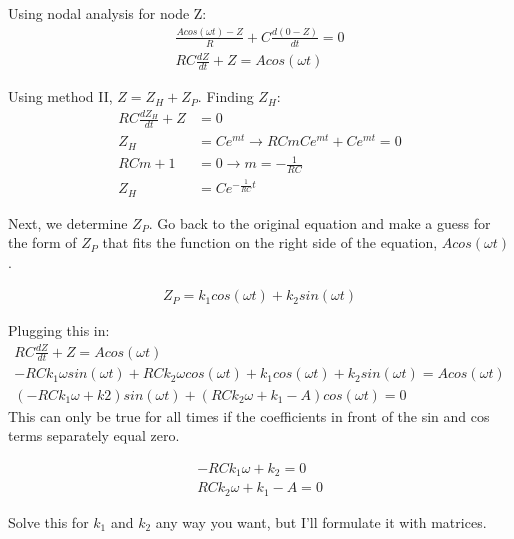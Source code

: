 \documentclass{book}
\numberwithin{equation}{section}
\theoremstyle{definition}
\begin{document}
Using nodal analysis for node Z:
\begin{align*}
\frac{Acos(\omega t)-Z}{R}+C\frac{d(0-Z)}{dt}=0\\
RC\frac{dZ}{dt}+Z=Acos(\omega t)
\end{align*}

Using method II, $Z = Z_H+Z_P$. Finding $Z_H$:
\begin{align*}
RC\frac{dZ_H}{dt}+Z&=0\\
Z_H&=Ce^{mt} \rightarrow RCmCe^{mt}+Ce^{mt}=0\\
RCm+1&=0 \rightarrow m=-\frac{1}{RC}\\
Z_H&=Ce^{-\frac{1}{RC}t}
\end{align*}

Next, we determine $Z_P$. Go back to the original equation and make a guess for the form of $Z_P$ that fits the function on the right side of the equation, $Acos(\omega t)$.\par

\begin{align*}
Z_P=k_1cos(\omega t)+k_2sin(\omega t)
\end{align*}

Plugging this in: 
\begin{align*}
RC\frac{dZ}{dt}+Z=Acos(\omega t)\\
-RCk_1\omega sin(\omega t)+RCk_2\omega cos(\omega t)+k_1cos(\omega t)+k_2sin(\omega t)=Acos(\omega t)\\
(-RCk_1\omega+k2) sin(\omega t)+(RCk_2\omega+k_1-A) cos(\omega t)=0
\end{align*}
This can only be true for all times if the coefficients  in front of the sin and cos terms separately equal zero. 

\begin{align*}
-RCk_1\omega+k_2 =0\\
RCk_2\omega+k_1-A=0
\end{align*}

Solve this for $k_1$ and $k_2$ any way you want, but I'll formulate it with matrices.
\end{document}
